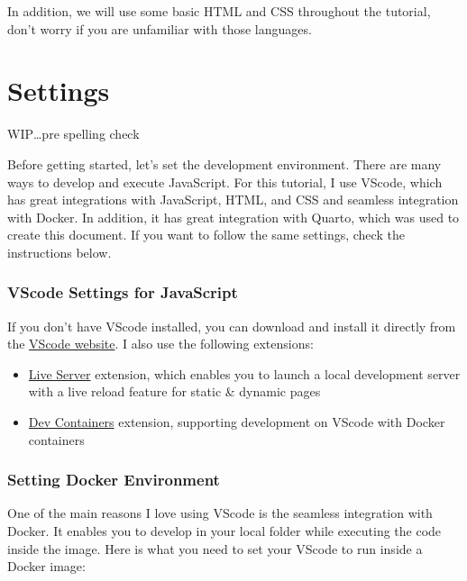 \documentclass[
  letterpaper,
  DIV=11,
  numbers=noendperiod]{scrreprt}
\providecommand{\tightlist}{%
  \setlength{\itemsep}{0pt}\setlength{\parskip}{0pt}}\usepackage{longtable,booktabs,array}
\begin{document}
In addition, we will use some basic HTML and CSS throughout the
tutorial, don't worry if you are unfamiliar with those languages.


\hypertarget{settings}{%
\chapter{Settings}\label{settings}}

WIP\ldots pre spelling check

Before getting started, let's set the development environment. There are
many ways to develop and execute JavaScript. For this tutorial, I use
VScode, which has great integrations with JavaScript, HTML, and CSS and
seamless integration with Docker. In addition, it has great integration
with Quarto, which was used to create this document. If you want to
follow the same settings, check the instructions below.

\hypertarget{vscode-settings-for-javascript}{%
\subsection{VScode Settings for
JavaScript}\label{vscode-settings-for-javascript}}

If you don't have VScode installed, you can download and install it
directly from the \href{https://code.visualstudio.com/}{VScode website}.
I also use the following extensions:

\begin{itemize}
\tightlist
\item
  \href{https://marketplace.visualstudio.com/items?itemName=ritwickdey.LiveServer}{Live
  Server} extension, which enables you to launch a local development
  server with a live reload feature for static \& dynamic pages
\item
  \href{https://marketplace.visualstudio.com/items?itemName=ms-vscode-remote.remote-containers}{Dev
  Containers} extension, supporting development on VScode with Docker
  containers
\end{itemize}

\hypertarget{setting-docker-environment}{%
\subsection{Setting Docker
Environment}\label{setting-docker-environment}}

One of the main reasons I love using VScode is the seamless integration
with Docker. It enables you to develop in your local folder while
executing the code inside the image. Here is what you need to set your
VScode to run inside a Docker image:
\end{document}
